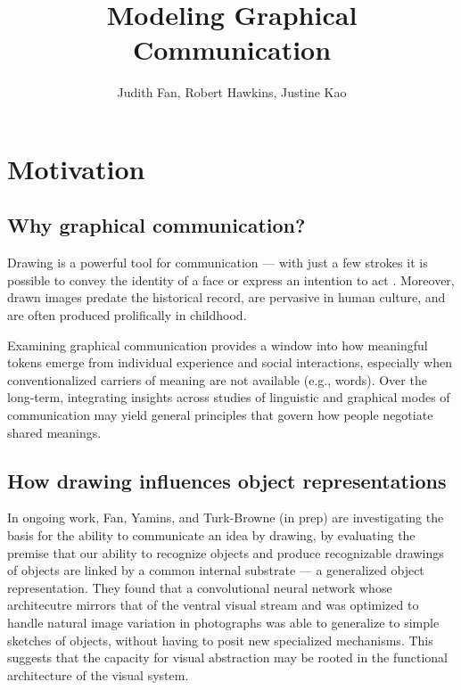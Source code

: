 \documentclass[12pt]{article}
\title{\textbf{Modeling Graphical Communication}}
\author{Judith Fan, Robert Hawkins, Justine Kao}
\begin{document}
\maketitle %

\section{Motivation}

\subsection{Why graphical communication?}

Drawing is a powerful tool for communication --- with just a few strokes it is possible to convey the identity of a face \cite{bergmann2013impact} or express an intention to act \cite{Galantucci:2005uh}. Moreover, drawn images predate the historical record, are pervasive in human culture, and are often produced prolifically in childhood.

Examining graphical communication provides a window into how meaningful tokens emerge from individual experience and social interactions, especially when conventionalized carriers of meaning are not available (e.g., words). Over the long-term, integrating insights across studies of linguistic and graphical modes of communication may yield general principles that govern how people negotiate shared meanings.  

\subsection{How drawing influences object representations}

In ongoing work, Fan, Yamins, and Turk-Browne (in prep) are investigating the basis for the ability to communicate an idea by drawing, by evaluating the premise that our ability to recognize objects and produce recognizable drawings of objects are linked by a common internal substrate --- a generalized object representation. They found that a convolutional neural network whose architecutre mirrors that of the ventral visual stream and was optimized to handle natural image variation in photographs \cite{Yamins:2014gia} was able to generalize to simple sketches of objects, without having to posit new specialized mechanisms. This suggests that the capacity for visual abstraction may be rooted in the functional architecture of the visual system.
\end{document}
